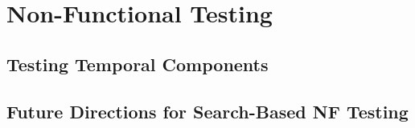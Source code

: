 \chapter{Non-Functional Testing}
\section{Testing Temporal Components}
\section{Future Directions for Search-Based NF Testing}
